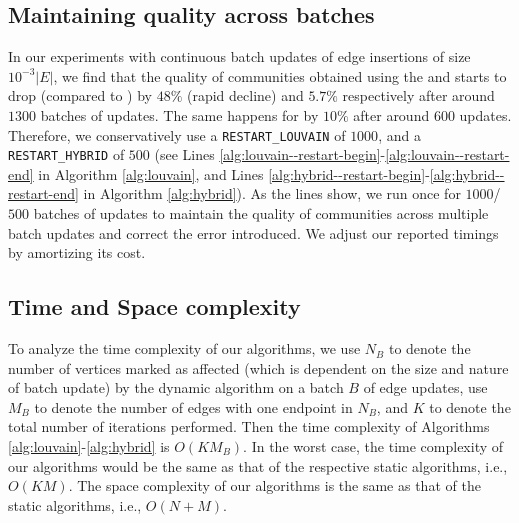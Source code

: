 \subsection{Maintaining quality across batches}
\label{sec:restart}

In our experiments with continuous batch updates of edge insertions of size $10^{-3} |E|$, we find that the quality of communities obtained using the \DelLou{} and \FroLou{} starts to drop (compared to \StaLou{}) by $48\%$ (rapid decline) and $5.7\%$ respectively after around $1300$ batches of updates. The same happens for \FroHyb{} by $10\%$ after around $600$ updates. Therefore, we conservatively use a \verb|RESTART_LOUVAIN| of $1000$, and a \verb|RESTART_HYBRID| of $500$ (see Lines \ref{alg:louvain--restart-begin}-\ref{alg:louvain--restart-end} in Algorithm \ref{alg:louvain}, and Lines \ref{alg:hybrid--restart-begin}-\ref{alg:hybrid--restart-end} in Algorithm \ref{alg:hybrid}). As the lines show, we run \StaLou{} once for $1000$/$500$ batches of updates to maintain the quality of communities across multiple batch updates and correct the error introduced. We adjust our reported timings by amortizing its cost.




\subsection{Time and Space complexity}
\label{sec:complexity}

To analyze the time complexity of our algorithms, we use $N_B$ to denote the number of vertices marked as affected (which is dependent on the size and nature of batch update) by the dynamic algorithm on a batch $B$ of edge updates, use $M_B$ to denote the number of edges with one endpoint in $N_B$, and $K$ to denote the total number of iterations performed. Then the time complexity of Algorithms \ref{alg:louvain}-\ref{alg:hybrid} is $O(K M_B)$. In the worst case, the time complexity of our algorithms would be the same as that of the respective static algorithms, i.e., $O(KM)$. The space complexity of our algorithms is the same as that of the static algorithms, i.e., $O(N + M)$.
